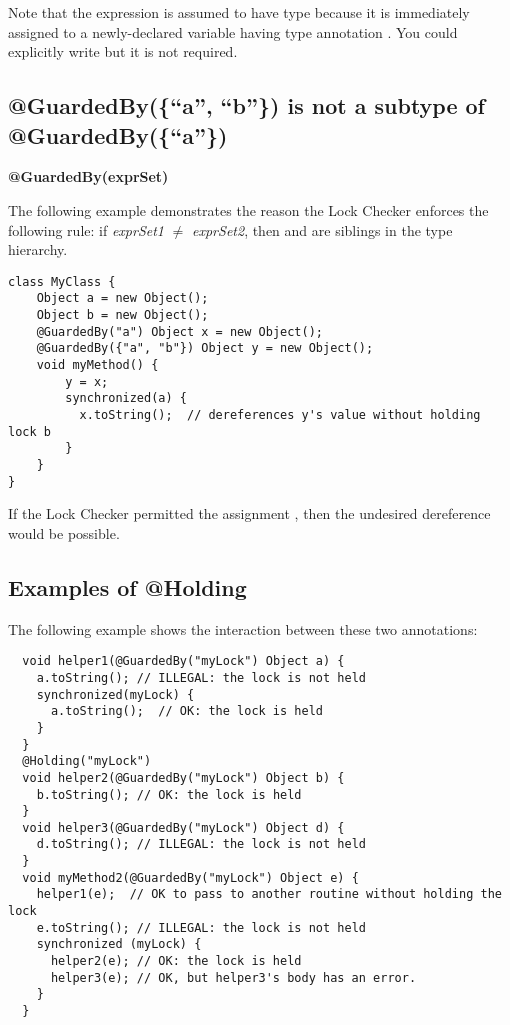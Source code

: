 Note that the expression  is assumed to have type 
because it is immediately assigned to a newly-declared
variable having type annotation .  You could
explicitly write  but it is not
required.


\subsection{@GuardedBy(\{``a'', ``b''\}) is not a subtype of @GuardedBy(\{``a''\})\label{lock-guardedby-invariant-subtyping}}


\textbf{@GuardedBy(exprSet)}

The following example demonstrates the reason the Lock Checker enforces the
following rule:  if \emph{exprSet1} $\neq$ \emph{exprSet2}, then
 and  are siblings in the type
hierarchy.

\begin{Verbatim}
class MyClass {
    Object a = new Object();
    Object b = new Object();
    @GuardedBy("a") Object x = new Object();
    @GuardedBy({"a", "b"}) Object y = new Object();
    void myMethod() {
        y = x;
        synchronized(a) {
          x.toString();  // dereferences y's value without holding lock b
        }
    }
}
\end{Verbatim}


If the Lock Checker permitted the assignment
, then the undesired dereference would be possible.


\subsection{Examples of @Holding\label{lock-examples-holding}}

The following example shows the interaction between these two annotations:

\begin{Verbatim}
  void helper1(@GuardedBy("myLock") Object a) {
    a.toString(); // ILLEGAL: the lock is not held
    synchronized(myLock) {
      a.toString();  // OK: the lock is held
    }
  }
  @Holding("myLock")
  void helper2(@GuardedBy("myLock") Object b) {
    b.toString(); // OK: the lock is held
  }
  void helper3(@GuardedBy("myLock") Object d) {
    d.toString(); // ILLEGAL: the lock is not held
  }
  void myMethod2(@GuardedBy("myLock") Object e) {
    helper1(e);  // OK to pass to another routine without holding the lock
    e.toString(); // ILLEGAL: the lock is not held
    synchronized (myLock) {
      helper2(e); // OK: the lock is held
      helper3(e); // OK, but helper3's body has an error.
    }
  }
\end{Verbatim}


